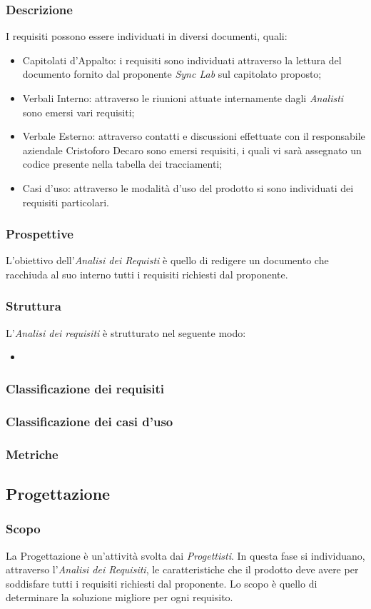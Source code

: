 \subsubsection{Descrizione}
I requisiti possono essere individuati in diversi documenti, quali:
\begin{itemize}
	\item Capitolati d'Appalto: i requisiti sono individuati attraverso la lettura del documento fornito dal proponente \emph{Sync Lab} sul capitolato proposto;
	\item Verbali Interno: attraverso le riunioni attuate internamente dagli \emph{Analisti} sono emersi vari requisiti;
	\item Verbale Esterno: attraverso contatti e discussioni effettuate con il responsabile aziendale Cristoforo Decaro sono emersi requisiti, i quali vi sarà assegnato un codice presente nella tabella dei tracciamenti;
	\item Casi d'uso: attraverso le modalità d'uso del prodotto si sono individuati dei requisiti particolari.
\end{itemize}
\subsubsection{Prospettive}
L'obiettivo dell'\emph{Analisi dei Requisti} è quello di redigere un documento che racchiuda al suo interno tutti i requisiti richiesti dal proponente.
\subsubsection{Struttura}
L'\emph{Analisi dei requisiti} è strutturato nel seguente modo:
\begin{itemize}
	\item 
\end{itemize}
\subsubsection{Classificazione dei requisiti}
\subsubsection{Classificazione dei casi d'uso}
\subsubsection{Metriche}


\subsection{Progettazione}
\subsubsection{Scopo}
La Progettazione è un'attività svolta dai \emph{Progettisti}. In questa fase si individuano, attraverso l'\emph{Analisi dei Requisiti}, le caratteristiche che il prodotto deve avere per soddisfare tutti i requisiti richiesti dal proponente. Lo scopo è quello di determinare la soluzione migliore per ogni requisito.
